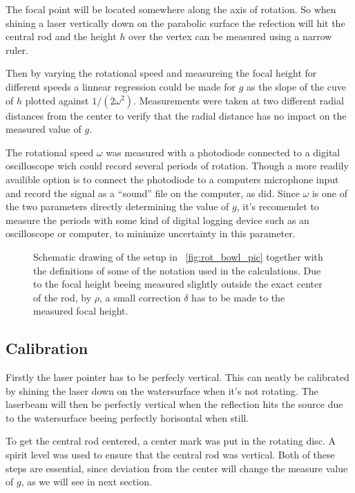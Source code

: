 \documentclass[11pt,towcolumn, swedish, english]{article}
\newcommand{\figref}{\figurename~\ref}
\begin{document}
The focal point will be located somewhere along the axis of rotation. So when
shining a laser vertically down on the parabolic surface the refection will hit
the central rod and the height $h$ over the vertex can be measured
using a narrow ruler. 

Then by varying the rotational speed and measureing the focal height for
different speeds a linnear regression could be made for $g$ as the
slope of the cuve of $h$ plotted against $1/(2\omega^2)$. 
Measurements were taken at two different radial distances from the
center to verify that the radial distance has no impact on the measured
value of $g$. 

The rotational speed $\omega$ was measured with a photodiode connected
to a digital oscilloscope wich could record several periods of
rotation. Though a more readily availible option is to connect the
photodiode to a computers microphone input and record the signal as a
``sound'' file on the computer, as \cite{Sabatka2010} did. Since
$\omega$ is one of the two parameters directly determining the value
of $g$, it's recomendet to measure the periods with some kind of
digital logging device such as an oscilloscope or computer, to
minimize uncertainty in this parameter.


\begin{figure}\centering
\resizebox{.6\linewidth}{!}{}
\caption{\label{fig:rot_bowl} Schematic drawing of the setup in
  \figref{fig:rot_bowl_pic} together with the definitions of some of
  the notation used in the calculations. Due to the focal height
  beeing measured slightly outside the exact center of the rod, by
  $\rho$, a small correction $\delta$ has to be made to the measured
  focal height. }
\end{figure}

\subsection{Calibration}
Firstly the laser pointer has to be perfecly vertical. This can neatly be
calibrated by shining the laser down on the watersurface when it's not
rotating. The laserbeam will then be perfectly vertical when the
reflection hits the source due to the watersurface beeing perfectly
horisontal when still.

To get the central rod centered, a center mark was put in the rotating
disc. A spirit level was used to ensure that the central rod was
vertical. Both of these steps are essential, since deviation from the
center will change the measure value of $g$, as we will see in next
section. 
\end{document}
